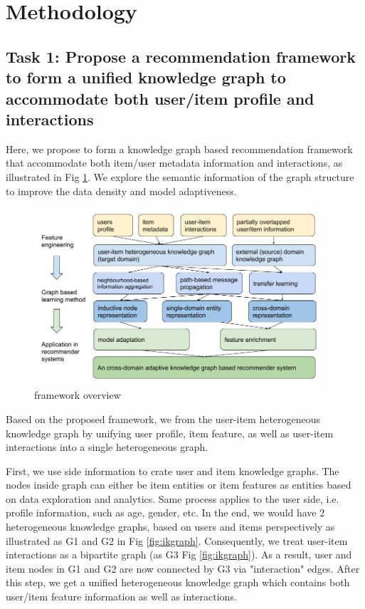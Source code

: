 



\section{Methodology}

\subsection*{Task 1: Propose a recommendation framework to form a unified knowledge graph to accommodate both user/item profile and interactions}

Here, we propose to form a knowledge graph based recommendation framework that accommodate both item/user metadata information and interactions, as illustrated in Fig \ref{fig:framework}. We explore the semantic information of the graph structure to improve the data density and model adaptiveness.

\begin{figure}[!h]
    \centering
    \includegraphics[width=0.95\textwidth]{figs/framework_overview.jpg}
    \caption{framework overview}\label{fig:framework}
\end{figure}

Based on the proposed framework, we from the user-item heterogeneous knowledge graph by unifying user profile, item feature, as well as user-item interactions into a single heterogeneous graph.

First, we use side information to crate user and item knowledge graphs. The nodes inside graph can either be item entities or item features as entities based on data exploration and analytics. Same process applies to the user side, i.e. profile information, such as age, gender, etc. In the end, we would have 2 heterogeneous knowledge graphs, based on users and items perspectively as illustrated as G1 and G2 in Fig \ref{fig:ikgraph}.
Consequently, we treat user-item interactions as a bipartite graph (as G3 Fig \ref{fig:ikgraph}). As a result, user and item nodes in G1 and G2 are now connected by G3 via "interaction" edges. After this step, we get a unified heterogeneous knowledge graph which contains both user/item feature information as well as interactions.

